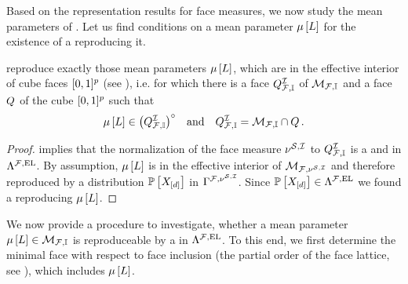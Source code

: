 \label{sec:HLNrepMean} %


Based on the representation results for face measures, we now study the mean parameters of \HybridLogicNetworks{}.
Let us find conditions on a mean parameter $\mu\left[L\right]$ for the existence of a \HybridLogicNetwork{} reproducing it. %

\begin{theorem}
    \label{the:hlnInteriorCharacterization}
    \HybridLogicNetworks{} reproduce exactly those mean parameters $\mu\left[L\right]$, which are in the effective interior of cube faces $[0,1]^{p}$ (see ), i.e. for which there is a face $Q^{\mathcal{I}}_{\mathcal{F},\mathbb{I}}$ of $\mathcal{M}_{\mathcal{F},\mathbb{I}}$ and a face $Q$ of the cube $[0,1]^{p}$ such that
    \begin{align*}
        \mu\left[L\right]\in{\left(Q^{\mathcal{I}}_{\mathcal{F},\mathbb{I}}\right)}^{\circ} \quad\text{and}\quad Q^{\mathcal{I}}_{\mathcal{F},\mathbb{I}} = \mathcal{M}_{\mathcal{F},\mathbb{I}}\cap Q \, .
    \end{align*}
\end{theorem}
\begin{proof}
     implies that the normalization of the face measure $\nu^{\mathcal{S},\mathcal{I}}$ to $Q^{\mathcal{I}}_{\mathcal{F},\mathbb{I}}$ is a \HardLogicNetwork{} and in $\Lambda^{\mathcal{F},\mathrm{EL}}$.
    By assumption, $\mu\left[L\right]$ is in the effective interior of $\mathcal{M}_{\mathcal{F},\nu^{\mathcal{S},\mathcal{I}}}$ and therefore reproduced by a distribution $\mathbb{P}\left[X_{[d]}\right]$ in $\Gamma^{\mathcal{F},\nu^{\mathcal{S},\mathcal{I}}}$.
    Since $\mathbb{P}\left[X_{[d]}\right]\in\Lambda^{\mathcal{F},\mathrm{EL}}$ we found a \HybridLogicNetwork{} reproducing $\mu\left[L\right]$.
\end{proof}

We now provide a procedure to investigate, whether a mean parameter $\mu\left[L\right]\in\mathcal{M}_{\mathcal{F},\mathbb{I}}$ is reproduceable by a \HybridLogicNetwork{} in $\Lambda^{\mathcal{F},\mathrm{EL}}$.
To this end, we first determine the minimal face with respect to face inclusion (the partial order of the face lattice, see \cite{ziegler_lectures_2013}), which includes $\mu\left[L\right]$.

